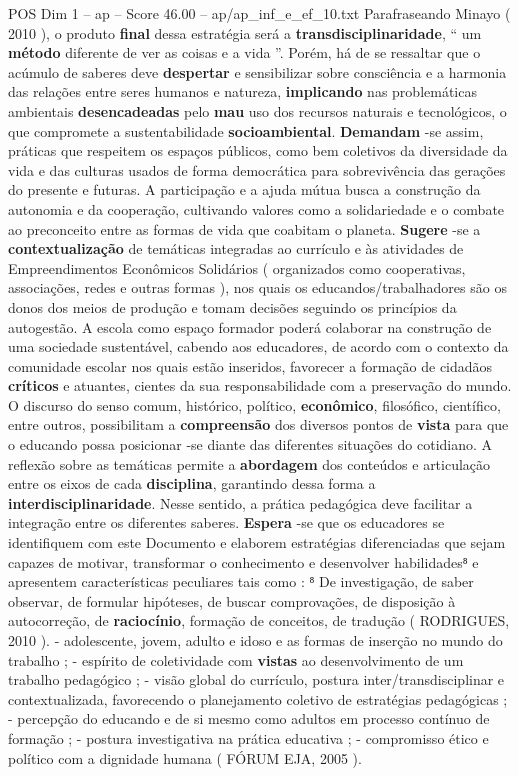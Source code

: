 \begin{textsample}{POS Dim 1 – ap – Score 46.00 – ap/ap\_inf\_e\_ef\_10.txt}
Parafraseando Minayo ( 2010 ), o produto \textbf{final} dessa estratégia será a \textbf{transdisciplinaridade}, “ um \textbf{método} diferente de ver as coisas e a vida ”.
Porém, há de se ressaltar que o acúmulo de saberes deve \textbf{despertar} e sensibilizar sobre consciência e a harmonia das relações entre seres humanos e natureza, \textbf{implicando} nas problemáticas ambientais \textbf{desencadeadas} pelo \textbf{mau} uso dos recursos naturais e tecnológicos, o que compromete a sustentabilidade \textbf{socioambiental}. \textbf{Demandam} -se assim, práticas que respeitem os espaços públicos, como bem coletivos da diversidade da vida e das culturas usados de forma democrática para sobrevivência das gerações do presente e futuras.
A participação e a ajuda mútua busca a construção da autonomia e da cooperação, cultivando valores como a solidariedade e o combate ao preconceito entre as formas de vida que coabitam o planeta. \textbf{Sugere} -se a \textbf{contextualização} de temáticas integradas ao currículo e às atividades de Empreendimentos Econômicos Solidários ( organizados como cooperativas, associações, redes e outras formas ), nos quais os educandos/trabalhadores são os donos dos meios de produção e tomam decisões seguindo os princípios da autogestão.
A escola como espaço formador poderá colaborar na construção de uma sociedade sustentável, cabendo aos educadores, de acordo com o contexto da comunidade escolar nos quais estão inseridos, favorecer a formação de cidadãos \textbf{críticos} e atuantes, cientes da sua responsabilidade com a preservação do mundo.
O discurso do senso comum, histórico, político, \textbf{econômico}, filosófico, científico, entre outros, possibilitam a \textbf{compreensão} dos diversos pontos de \textbf{vista} para que o educando possa posicionar -se diante das diferentes situações do cotidiano.
A reflexão sobre as temáticas permite a \textbf{abordagem} dos conteúdos e articulação entre os eixos de cada \textbf{disciplina}, garantindo dessa forma a \textbf{interdisciplinaridade}.
Nesse sentido, a prática pedagógica deve facilitar a integração entre os diferentes saberes. \textbf{Espera} -se que os educadores se identifiquem com este Documento e elaborem estratégias diferenciadas que sejam capazes de motivar, transformar o conhecimento e desenvolver habilidades⁸ e apresentem características peculiares tais como : ⁸ De investigação, de saber observar, de formular hipóteses, de buscar comprovações, de disposição à autocorreção, de \textbf{raciocínio}, formação de conceitos, de tradução ( RODRIGUES, 2010 ). - adolescente, jovem, adulto e idoso e as formas de inserção no mundo do trabalho ; - espírito de coletividade com \textbf{vistas} ao desenvolvimento de um trabalho pedagógico ; - visão global do currículo, postura inter/transdisciplinar e contextualizada, favorecendo o planejamento coletivo de estratégias pedagógicas ; - percepção do educando e de si mesmo como adultos em processo contínuo de formação ; - postura investigativa na prática educativa ; - compromisso ético e político com a dignidade humana ( FÓRUM EJA, 2005 ).


\end{textsample}
